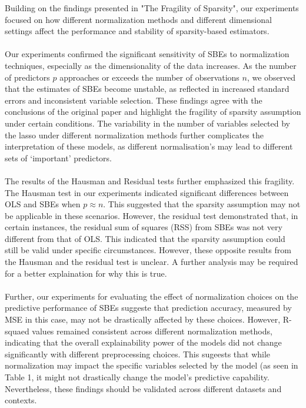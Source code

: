Building on the findings presented in "The Fragility of Sparsity", our experiments focused on how different normalization methods and different dimensional settings affect the performance and stability of sparsity-based estimators. \\
\\
Our experiments confirmed the significant sensitivity of SBEs to normalization techniques, especially as the dimensionality of the data increases. As the number of predictors $p$ approaches or exceeds the number of observations $n$, we observed that the estimates of SBEs become unstable, as reflected in increased standard errors and inconsistent variable selection. These findings agree with the conclusions of the original paper and highlight the fragility of sparsity assumption under certain conditions. The variability in the number of variables selected by the lasso under different normalization methods further complicates the interpretation of these models, as different normalisation's may lead to different sets of `important' predictors. \\
\\
The results of the Hausman and Residual tests further emphasized this fragility. The Hausman test in our experiments indicated significant differences between OLS and SBEs when $p \approx n$. This suggested that the sparsity assumption may not be applicable in these scenarios. However, the residual test demonstrated that, in certain instances, the residual sum of squares (RSS) from SBEs was not very different from that of OLS. This indicated that the sparsity assumption could still be valid under specific circumstances. However, these opposite results from the Hausman and the residual test is unclear. A further analysis may be required for a better explaination for why this is true. \\
\\
Further, our experiments for evaluating the effect of normalization choices on the predictive performance of SBEs suggeste that prediction accuracy, measured by MSE in this case, may not be drastically affected by these choices. However, R-squaed values remained consistent across different normalization methods, indicating that the overall explainability power of the models did not change significantly with different preprocessing choices. This sugeests that while normalization may impact the specific variables selected by the model (as seen in Table 1, it might not drastically change the model's predictive capability. Nevertheless, these findings should be validated across different datasets and contexts. \\

